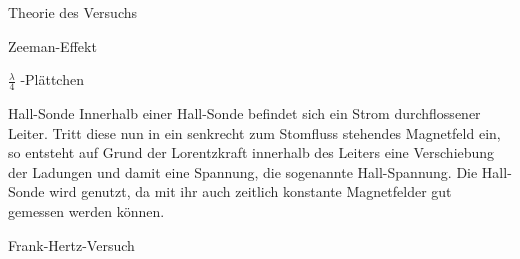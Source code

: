 \documentclass[pdftex, a4paper,11pt, twoside, ngerman]{report}
\begin{document}
\begin{chapter}{Theorie des Versuchs}
\begin{section}{Zeeman-Effekt}
\begin{subsection}{$\frac{\lambda}{4}$ -Plättchen}
      \end{subsection}
      
      
      
      \begin{subsection}{Hall-Sonde}
        Innerhalb einer Hall-Sonde befindet sich ein Strom durchflossener
        Leiter. Tritt diese nun in ein senkrecht zum Stomfluss stehendes
        Magnetfeld ein, so entsteht auf Grund der Lorentzkraft innerhalb des
        Leiters eine Verschiebung der Ladungen und damit eine Spannung, die
        sogenannte Hall-Spannung. Die Hall-Sonde wird genutzt, da mit ihr auch
        zeitlich konstante Magnetfelder gut gemessen werden können.
        

      \end{subsection}
      
    \end{section}
    
    
    
    \begin{section}{Frank-Hertz-Versuch}
      
      
      

\end{section}
\end{chapter}
\end{document}
